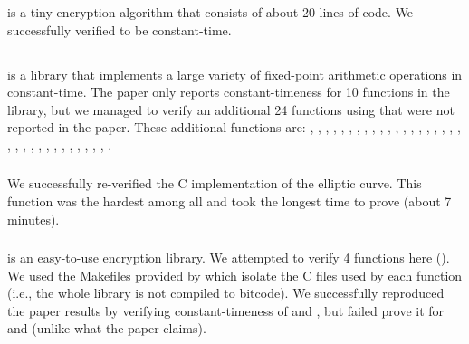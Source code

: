 \subsubsection{}
 is a tiny encryption algorithm that consists of about 20 lines
of code. We successfully verified  to be constant-time.



\subsection{} 
is a library that implements a large variety of fixed-point arithmetic
operations in constant-time. The paper only reports constant-timeness for 10
functions in the library, but we managed to verify an additional 24 functions using \ctVerif
that were not reported in the paper. These additional functions are:
,
,
,
,
,
,
,
,
,
,
,
,
,
,
,
,
,
,
,
,
,
,
,
,
,
,
,
,
,
,
,
,
,
.

\subsubsection{} We successfully re-verified the C
implementation of the  elliptic curve. This function
was the hardest among all and took the longest time to prove (about 7 minutes).


\subsubsection{}  is an easy-to-use
encryption library. We attempted to verify 4 functions here (). We used the Makefiles
provided by \ctVerif which isolate the C files used by each function (i.e., the
whole library is not compiled to  bitcode). We successfully
reproduced the paper results by verifying constant-timeness of
 and , but failed prove it for
 and  (unlike what the paper claims).


